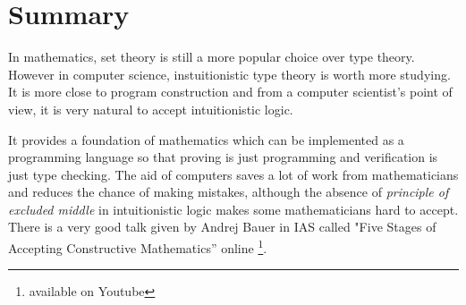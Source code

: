 




\section{Summary}


In mathematics, set theory is still a more popular choice over type theory. However in computer science, instuitionistic type theory is worth more studying. It is more close to program construction and from a computer scientist's point of view, it is very natural to accept intuitionistic logic. 

It provides a foundation of mathematics which can be implemented as a programming language so that proving is just programming and verification is just type checking. The aid of computers saves a lot of work from mathematicians and reduces the chance of making mistakes, although the absence of \emph{principle of excluded middle} in intuitionistic logic makes some mathematicians hard to accept. There is a very good talk given by Andrej Bauer in IAS called "Five Stages of Accepting Constructive Mathematics'' online \footnote{available on Youtube}.




